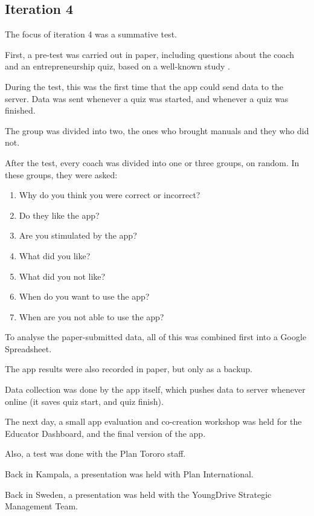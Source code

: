 \subsection{Iteration 4}

The focus of iteration 4 was a summative test.

First, a pre-test was carried out in paper, including questions about the coach and an entrepreneurship quiz, based on a well-known study \citep{general-entrepreneurship-quiz}.

During the test, this was the first time that the app could send data to the server. Data was sent whenever a quiz was started, and whenever a quiz was finished.

The group was divided into two, the ones who brought manuals and they who did not.

After the test, every coach was divided into one or three groups, on random. In these groups, they were asked:

\begin{enumerate}
\item Why do you think you were correct or incorrect?
\item Do they like the app?
\item Are you stimulated by the app?
\item What did you like?
\item What did you not like?
\item When do you want to use the app?
\item When are you not able to use the app?
\end{enumerate}

To analyse the paper-submitted data, all of this was combined first into a Google Spreadsheet.

The app results were also recorded in paper, but only as a backup.

Data collection was done by the app itself, which pushes data to server whenever online (it saves quiz start, and quiz finish).

The next day, a small app evaluation and co-creation workshop was held for the Educator Dashboard, and the final version of the app.

Also, a test was done with the Plan Tororo staff.

Back in Kampala, a presentation was held with Plan International.

Back in Sweden, a presentation was held with the YoungDrive Strategic Management Team.
